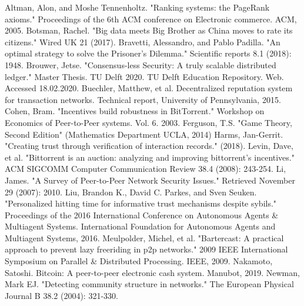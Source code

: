 \documentclass[whitelogo]{tudelft-report}
\theoremstyle{definition}
\theoremstyle{theorem}
\theoremstyle{proposition}
\theoremstyle{corollary}
\theoremstyle{lemma}
\theoremstyle{example}
\theoremstyle{remark}
\begin{document}



\begin{thebibliography}{9}
Altman, Alon, and Moshe Tennenholtz. "Ranking systems: the PageRank axioms." Proceedings of the 6th ACM conference on Electronic commerce. ACM, 2005.
Botsman, Rachel. "Big data meets Big Brother as China moves to rate its citizens." Wired UK 21 (2017).
Bravetti, Alessandro, and Pablo Padilla. "An optimal strategy to solve the Prisoner’s Dilemma." Scientific reports 8.1 (2018): 1948.
Brouwer, Jetse. "Consensus-less Security: A truly scalable distributed ledger." Master Thesis. TU Delft 2020. TU Delft Education Repository. Web. Accessed 18.02.2020.
Buechler, Matthew, et al. Decentralized reputation system for transaction networks. Technical report, University of Pennsylvania, 2015.
Cohen, Bram. "Incentives build robustness in BitTorrent." Workshop on Economics of Peer-to-Peer systems. Vol. 6. 2003.
Ferguson, T.S. "Game Theory, Second Edition" (Mathematics Department UCLA, 2014)
Harms, Jan-Gerrit. "Creating trust through verification of interaction records." (2018).
Levin, Dave, et al. "Bittorrent is an auction: analyzing and improving bittorrent's incentives." ACM SIGCOMM Computer Communication Review 38.4 (2008): 243-254.
Li, James. "A Survey of Peer-to-Peer Network Security Issues." Retrieved November 29 (2007): 2010.
Liu, Brandon K., David C. Parkes, and Sven Seuken. "Personalized hitting time for informative trust mechanisms despite sybils." Proceedings of the 2016 International Conference on Autonomous Agents \& Multiagent Systems. International Foundation for Autonomous Agents and Multiagent Systems, 2016.
Meulpolder, Michel, et al. "Bartercast: A practical approach to prevent lazy freeriding in p2p networks." 2009 IEEE International Symposium on Parallel \& Distributed Processing. IEEE, 2009.
Nakamoto, Satoshi. Bitcoin: A peer-to-peer electronic cash system. Manubot, 2019.
Newman, Mark EJ. "Detecting community structure in networks." The European Physical Journal B 38.2 (2004): 321-330.

\end{thebibliography}
\end{document}
